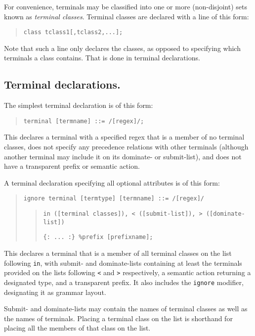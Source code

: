 \documentclass[12pt,english,twoside]{report}
\begin{document}
For convenience, terminals may be classified into one or more
(non-disjoint) sets known as \emph{terminal classes}. Terminal
classes are declared with a line of this form:

\begin{quote}
\texttt{class tclass1{[},tclass2,...];}
\end{quote}
Note that such a line only declares the classes, as opposed to specifying
which terminals a class contains. That is done in terminal declarations.


\subsection{\label{sub:Terminal-declarations.}Terminal declarations.}

The simplest terminal declaration is of this form:

\begin{quote}
\texttt{terminal {[}termname] ::= /{[}regex]/;}
\end{quote}
This declares a terminal with a specified regex that is a member of
no terminal classes, does not specify any precedence relations with
other terminals (although another terminal may include it on its dominate-
or submit-list), and does not have a transparent prefix or semantic
action.

A terminal declaration specifying all optional attributes is of this
form:

\begin{quote}
\texttt{ignore terminal {[}termtype] {[}termname] ::= /{[}regex]/}
\begin{quote}
\texttt{in ({[}terminal classes]), < ({[}submit-list]), > ({[}dominate-list])}

\texttt{\{: ... :\} \%prefix {[}prefixname];}
\end{quote}
\end{quote}
This declares a terminal that is a member of all terminal classes
on the list following \texttt{in}, with submit- and dominate-lists
containing at least the terminals provided on the lists following
\texttt{<} and \texttt{>} respectively, a semantic action returning
a designated type, and a transparent prefix. It also includes the
\texttt{ignore} modifier, designating it as grammar layout.

Submit- and dominate-lists may contain the names of terminal classes
as well as the names of terminals. Placing a terminal class on the
list is shorthand for placing all the members of that class on the
list.
\end{document}
